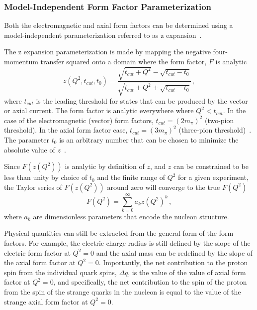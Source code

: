   \subsubsection{Model-Independent Form Factor Parameterization}

  Both the electromagnetic and axial form factors can be determined using a
  model-independent parameterization referred to as z
  expansion~\cite{Boyd:1997qw}.

  The z expansion parameterization is made by mapping the negative
  four-momentum transfer squared onto a domain where the form factor, $F$ is
  analytic
  \begin{equation}\label{eq:zdef}
    z(Q^2,t_{cut},t_0) = 
    \frac{\sqrt{t_{cut}+Q^2} - \sqrt{t_{cut} - t_0}}{\sqrt{t_{cut}+Q^2} + \sqrt{t_{cut} - t_0}} \,,
  \end{equation}
  where $t_{cut}$ is the leading threshold for states that can be produced by
  the vector or axial current. The form factor is analytic everywhere where
  $Q^2 < t_{cut}$.  In the case of the electromagnetic (vector) form factors,
  $t_{cut} = (2m_{\pi})^2$ (two-pion threshold). In the axial form factor case,
  $t_{cut} = (3m_{\pi})^2$ (three-pion threshold)~\cite{Federbush:1958zz}. The
  parameter $t_0$ is an arbitrary number that can be chosen to minimize the
  absolute value of $z$~\cite{Meyer:2016oeg}.

  Since $F(z(Q^2))$ is analytic by definition of $z$, and $z$ can be
  constrained to be less than unity by choice of $t_0$ and the finite range of
  $Q^2$ for a given experiment, the Taylor series of $F(z(Q^2))$ around zero
  will converge to the true $F(Q^2)$
  \begin{equation}
    F(Q^2) = \sum_{k=0}^{\infty}a_{k}z(Q^2)^k \,,
  \end{equation}
  where $a_k$ are dimensionless parameters that encode the nucleon structure.

  Physical quantities can still be extracted from the general form of the form
  factors. For example, the electric charge radius is still defined by the
  slope of the electric form factor at $Q^2 = 0$ and the axial mass can be
  redefined by the slope of the axial form factor at $Q^2 = 0$.  Importantly,
  the net contribution to the proton spin from the individual quark spins,
  $\Delta q$, is the value of the value of axial form factor at $Q^2 = 0$, and
  specifically, the net contribution to the spin of the proton from the spin of
  the strange quarks in the nucleon is equal to the value of the strange axial
  form factor at $Q^2 = 0$.


